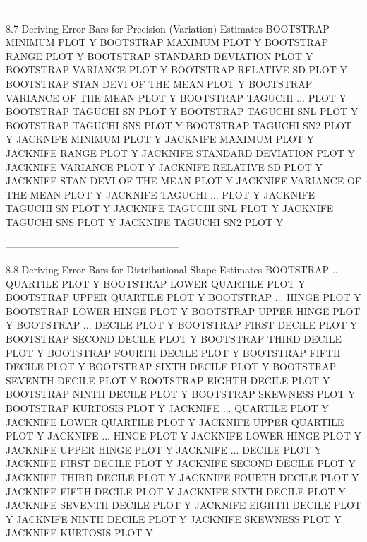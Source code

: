 -----------------------------------------------------
 
8.7
Deriving Error Bars for Precision (Variation) Estimates
      BOOTSTRAP MINIMUM PLOT Y
      BOOTSTRAP MAXIMUM PLOT Y
      BOOTSTRAP RANGE PLOT Y
      BOOTSTRAP STANDARD DEVIATION PLOT Y
      BOOTSTRAP VARIANCE PLOT Y
      BOOTSTRAP RELATIVE SD PLOT Y
      BOOTSTRAP STAN DEVI OF THE MEAN PLOT Y
      BOOTSTRAP VARIANCE OF THE MEAN PLOT Y
      BOOTSTRAP TAGUCHI ... PLOT Y
         BOOTSTRAP TAGUCHI SN PLOT Y
         BOOTSTRAP TAGUCHI SNL PLOT Y
         BOOTSTRAP TAGUCHI SNS PLOT Y
         BOOTSTRAP TAGUCHI SN2 PLOT Y
      JACKNIFE  MINIMUM PLOT Y
      JACKNIFE  MAXIMUM PLOT Y
      JACKNIFE  RANGE PLOT Y
      JACKNIFE  STANDARD DEVIATION PLOT Y
      JACKNIFE  VARIANCE PLOT Y
      JACKNIFE  RELATIVE SD PLOT Y
      JACKNIFE  STAN DEVI OF THE MEAN PLOT Y
      JACKNIFE  VARIANCE OF THE MEAN PLOT Y
      JACKNIFE  TAGUCHI ... PLOT Y
         JACKNIFE  TAGUCHI SN PLOT Y
         JACKNIFE  TAGUCHI SNL PLOT Y
         JACKNIFE  TAGUCHI SNS PLOT Y
         JACKNIFE  TAGUCHI SN2 PLOT Y
 
-----------------------------------------------------
 
8.8
Deriving Error Bars for Distributional Shape Estimates
      BOOTSTRAP ... QUARTILE PLOT Y
         BOOTSTRAP LOWER QUARTILE PLOT Y
         BOOTSTRAP UPPER QUARTILE PLOT Y
      BOOTSTRAP ... HINGE PLOT Y
         BOOTSTRAP LOWER HINGE PLOT Y
         BOOTSTRAP UPPER HINGE PLOT Y
      BOOTSTRAP ... DECILE PLOT Y
         BOOTSTRAP FIRST DECILE PLOT Y
         BOOTSTRAP SECOND DECILE PLOT Y
         BOOTSTRAP THIRD DECILE PLOT Y
         BOOTSTRAP FOURTH DECILE PLOT Y
         BOOTSTRAP FIFTH DECILE PLOT Y
         BOOTSTRAP SIXTH DECILE PLOT Y
         BOOTSTRAP SEVENTH DECILE PLOT Y
         BOOTSTRAP EIGHTH DECILE PLOT Y
         BOOTSTRAP NINTH DECILE PLOT Y
      BOOTSTRAP SKEWNESS PLOT Y
      BOOTSTRAP KURTOSIS PLOT Y
      JACKNIFE  ... QUARTILE PLOT Y
         JACKNIFE  LOWER QUARTILE PLOT Y
         JACKNIFE  UPPER QUARTILE PLOT Y
      JACKNIFE  ... HINGE PLOT Y
         JACKNIFE  LOWER HINGE PLOT Y
         JACKNIFE  UPPER HINGE PLOT Y
      JACKNIFE  ... DECILE PLOT Y
         JACKNIFE  FIRST DECILE PLOT Y
         JACKNIFE  SECOND DECILE PLOT Y
         JACKNIFE  THIRD DECILE PLOT Y
         JACKNIFE  FOURTH DECILE PLOT Y
         JACKNIFE  FIFTH DECILE PLOT Y
         JACKNIFE  SIXTH DECILE PLOT Y
         JACKNIFE  SEVENTH DECILE PLOT Y
         JACKNIFE  EIGHTH DECILE PLOT Y
         JACKNIFE  NINTH DECILE PLOT Y
      JACKNIFE  SKEWNESS PLOT Y
      JACKNIFE  KURTOSIS PLOT Y
 
